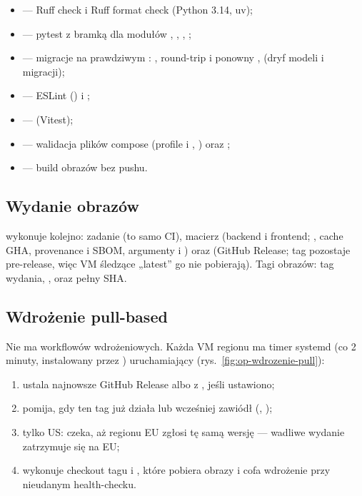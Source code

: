\begin{itemize}
  \item {} --- Ruff check i Ruff format check (Python 3.14, uv);
  \item {} --- pytest z bramką  dla modułów , , , ;
  \item {} --- migracje na prawdziwym : , round-trip  i ponowny ,  (dryf modeli i migracji);
  \item {} --- ESLint () i ;
  \item {} ---  (Vitest);
  \item {} --- walidacja plików compose (profile  i , ) oraz ;
  \item {} --- build obrazów bez pushu.
\end{itemize}

\subsection{Wydanie obrazów}

 wykonuje kolejno: zadanie  (to samo CI), macierz
 (backend i frontend; , cache GHA, provenance i SBOM,
argumenty  i ) oraz  (GitHub Release;
tag  pozostaje pre-release, więc VM śledzące „latest'' go nie
pobierają). Tagi obrazów: tag wydania, ,  oraz pełny SHA.

\subsection{Wdrożenie pull-based}

Nie ma workflowów wdrożeniowych. Każda VM regionu ma timer systemd (co 2 minuty,
instalowany przez ) uruchamiający
 (rys.~\ref{fig:op-wdrozenie-pull}):

\begin{enumerate}
  \item ustala najnowsze GitHub Release albo  z , jeśli ustawiono;
  \item pomija, gdy ten tag już działa lub wcześniej zawiódł (, );
  \item tylko US: czeka, aż  regionu EU zgłosi tę samą wersję --- wadliwe wydanie zatrzymuje się na EU;
  \item wykonuje checkout tagu i , które pobiera obrazy i cofa wdrożenie przy nieudanym health-checku.
\end{enumerate}

